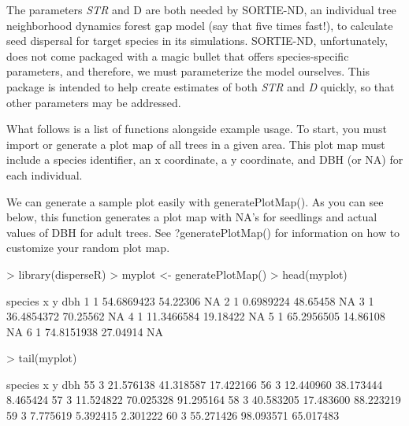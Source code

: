 \documentclass{article}
\begin{document}
The parameters \textit{STR} and {D} are both needed by SORTIE-ND, an individual tree neighborhood dynamics forest gap model (say that five times fast!), to calculate seed dispersal for target species in its simulations. SORTIE-ND, unfortunately, does not come packaged with a magic bullet that offers species-specific parameters, and therefore, we must parameterize the model ourselves. This package is intended to help create estimates of both \textit{STR} and \textit{D} quickly, so that other parameters may be addressed.

What follows is a list of functions alongside example usage. To start, you must import or generate a plot map of all trees in a given area. This plot map must include a species identifier, an x coordinate, a y coordinate, and DBH (or NA) for each individual.

We can generate a sample plot easily with generatePlotMap(). As you can see below, this function generates a plot map with NA's for seedlings and actual values of DBH for adult trees. See ?generatePlotMap() for information on how to customize your random plot map.
\begin{Schunk}
\begin{Sinput}
> library(disperseR)
> myplot <- generatePlotMap()
> head(myplot)
\end{Sinput}
\begin{Soutput}
  species          x        y dbh
1       1 54.6869423 54.22306  NA
2       1  0.6989224 48.65458  NA
3       1 36.4854372 70.25562  NA
4       1 11.3466584 19.18422  NA
5       1 65.2956505 14.86108  NA
6       1 74.8151938 27.04914  NA
\end{Soutput}
\begin{Sinput}
> tail(myplot)
\end{Sinput}
\begin{Soutput}
   species         x         y       dbh
55       3 21.576138 41.318587 17.422166
56       3 12.440960 38.173444  8.465424
57       3 11.524822 70.025328 91.295164
58       3 40.583205 17.483600 88.223219
59       3  7.775619  5.392415  2.301222
60       3 55.271426 98.093571 65.017483
\end{Soutput}
\end{Schunk}





\end{document}

